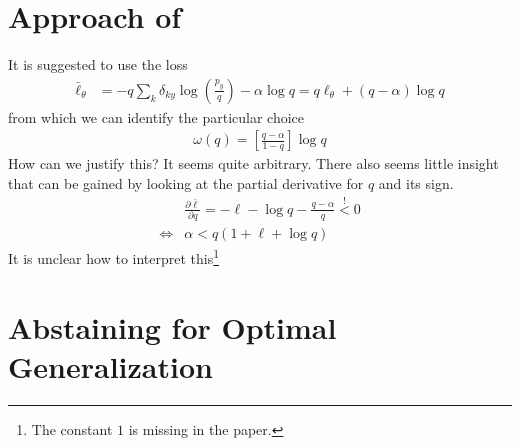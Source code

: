 \documentclass[12pt,a4paper]{article}
\begin{document}
\section{Approach of \cite{thulasidasan2019combating}}
It is  suggested to use the loss 
\begin{align}
\bar \ell_\theta &  = - q \sum_k \delta_{ky}  \log \left( \frac{p_y}{q}\right) - \alpha \log q   = q \ell_\theta  + (q - \alpha ) \log q  
\end{align}
from which we can identify the particular choice 
\begin{align}
\omega(q) = \left[ \frac{q-\alpha}{1-q} \right]\log q
\end{align}
How can we justify this? It seems quite arbitrary. There also seems little insight that can be gained by looking at the partial derivative for $q$ and its sign. 
\begin{align}
	& \frac{\partial \bar\ell}{\partial q} = - \ell - \log q  - \frac{q-\alpha}{q} \stackrel ! < 0 \\
\iff 	& \alpha  < q (1+ \ell + \log q)
\end{align} 
It is unclear how to interpret this\footnote{The constant $1$ is missing in the paper.}

\section{Abstaining for Optimal Generalization} 
\end{document}

